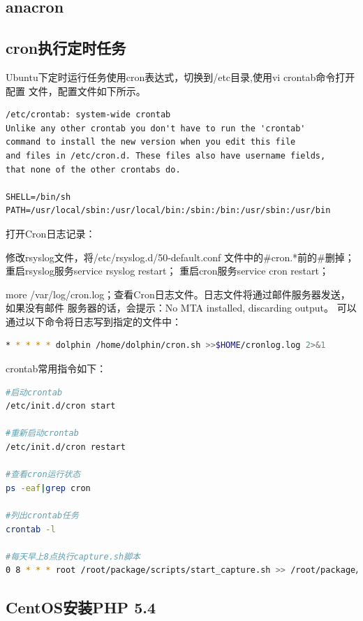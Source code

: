 \documentclass{book}
\begin{document}
\subsection{anacron}

\subsection{cron执行定时任务}

Ubuntu下定时运行任务使用cron表达式，切换到/etc目录,使用vi crontab命令打开配置
文件，配置文件如下所示。

\begin{lstlisting}
/etc/crontab: system-wide crontab
Unlike any other crontab you don't have to run the 'crontab'
command to install the new version when you edit this file
and files in /etc/cron.d. These files also have username fields,
that none of the other crontabs do.

SHELL=/bin/sh
PATH=/usr/local/sbin:/usr/local/bin:/sbin:/bin:/usr/sbin:/usr/bin
\end{lstlisting}

打开Cron日志记录：

修改rsyslog文件，将/etc/rsyslog.d/50-default.conf 文件中的\#cron.*前的\#删掉；
重启rsyslog服务service rsyslog restart；
重启cron服务service cron restart；

more /var/log/cron.log；查看Cron日志文件。日志文件将通过邮件服务器发送，如果没有邮件
服务器的话，会提示：No MTA installed, discarding output。
可以通过以下命令将日志写到指定的文件中：

\begin{lstlisting}[language=Bash]
* * * * * dolphin /home/dolphin/cron.sh >>$HOME/cronlog.log 2>&1
\end{lstlisting}

crontab常用指令如下：

\begin{lstlisting}[language=Bash]
#启动crontab
/etc/init.d/cron start

#重新启动crontab
/etc/init.d/cron restart

#查看cron运行状态
ps -eaf|grep cron

#列出crontab任务
crontab -l

#每天早上8点执行capture.sh脚本
0 8 * * * root /root/package/scripts/start_capture.sh >> /root/package/capture.log
\end{lstlisting}

\subsection{CentOS安装PHP 5.4}
\end{document}
